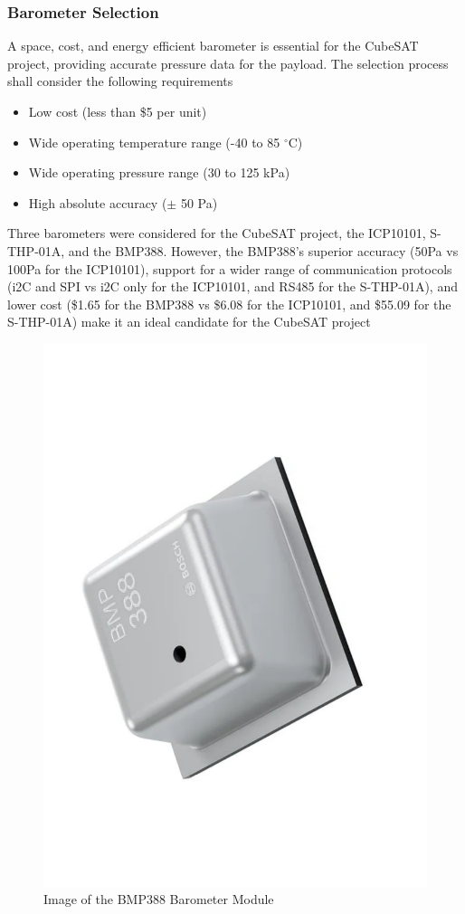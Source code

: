\documentclass{report}
\begin{document}
                \subsubsection{Barometer Selection}
                    A space, cost, and energy efficient barometer is essential for the CubeSAT project,
                    providing accurate pressure data for the payload. The selection process shall consider
                    the following requirements
                    \begin{itemize}
                        \item Low cost (less than \$5 per unit)
                        \item Wide operating temperature range (-40 to 85 $^\circ$C)
                        \item Wide operating pressure range (30 to 125 kPa)
                        \item High absolute accuracy ($\pm$ 50 Pa)
                    \end{itemize}
                    Three barometers were considered for the CubeSAT project, the ICP10101, S-THP-01A, and
                    the BMP388. However, the BMP388's superior accuracy (50Pa vs 100Pa for the ICP10101),
                    support for a wider range of communication protocols (i2C and SPI vs i2C only for the ICP10101, and 
                    RS485 for the S-THP-01A), and lower cost (\$1.65 for the BMP388 vs \$6.08 for the ICP10101, and \$55.09 for the S-THP-01A)
                    make it an ideal candidate for the CubeSAT project \cite{bosch2023}
                    \begin{figure}[H]
                        \centering
                        \includegraphics[width=0.2\linewidth, angle=260]{figures/BARO_IMG.pdf}
                        \caption{Image of the BMP388 Barometer Module}
                        \label{fig:baro_img}
                    \end{figure}
\end{document}
